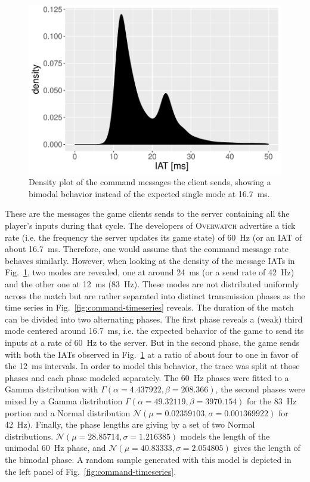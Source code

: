 \begin{figure}[t]
	\centering
	\includegraphics[width=1.0\columnwidth]{images/command-density.pdf}
	\caption{Density plot of the command messages the client sends, showing a bimodal behavior instead of the expected single mode at \SI{16.7}{\milli\second}.}
\label{fig:command-density}
\end{figure}

These are the messages the game clients sends to the server containing all the player's inputs during that cycle. The developers of \textsc{Overwatch} advertise a tick rate (i.e. the frequency the server updates its game state) of \SI{60}{\hertz} (or an \gls{IAT} of about \SI{16.7}{\milli\second}. Therefore, one would assume that the command message rate behaves similarly. However, when looking at the density of the message \glspl{IAT} in Fig.~\ref{fig:command-density}, two modes are revealed, one at around \SI{24}{\milli\second} (or a send rate of \SI{42}{\hertz}) and the other one at \SI{12}{\milli\second} (\SI{83}{\hertz}). These modes are not distributed uniformly across the match but are rather separated into distinct transmission phases as the time series in Fig.~\ref{fig:command-timeseries} reveals. The duration of the match can be divided into two alternating phases. The first phase reveals a (weak) third mode centered around \SI{16.7}{\milli\second}, i.e. the expected behavior of the game to send its inputs at a rate of \SI{60}{\hertz} to the server. But in the second phase, the game sends with both the \glspl{IAT} observed in Fig.~\ref{fig:command-density} at a ratio of about four to one in favor of the \SI{12}{\milli\second} intervals. In order to model this behavior, the trace was split at those phases and each phase modeled separately. The \SI{60}{\hertz} phases were fitted to a Gamma distribution with $\Gamma(\alpha = 4.437922, \beta = 208.366)$, the second phases were mixed by a Gamma distribution $\Gamma(\alpha = 49.32119, \beta = 3970.154)$ for the \SI{83}{\hertz} portion and a Normal distribution $\mathcal{N}(\mu = 0.02359103, \sigma = 0.001369922)$ for \SI{42}{\hertz}). Finally, the phase lengths are giving by a set of two Normal distributions. $\mathcal{N}(\mu = 28.85714, \sigma = 1.216385)$ models the length of the unimodal \SI{60}{\hertz} phase, and $\mathcal{N}(\mu = 40.83333, \sigma = 2.054805)$ gives the length of the bimodal phase. A random sample generated with this model is depicted in the left panel of Fig.~\ref{fig:command-timeseries}.

